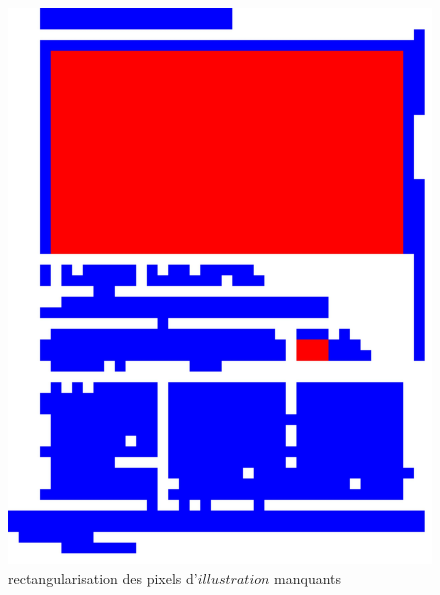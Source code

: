 \documentclass{book}
\begin{document}
\begin{figure}[H]
\begin{center}
\includegraphics[scale=0.06]{images/rect_1_res_hog_hsv_kmeans_2.jpg}
\end{center}
\caption{\og rectangularisation \fg des pixels d'$illustration$ manquants}
\label{rect3}
\end{figure}
\end{document}
